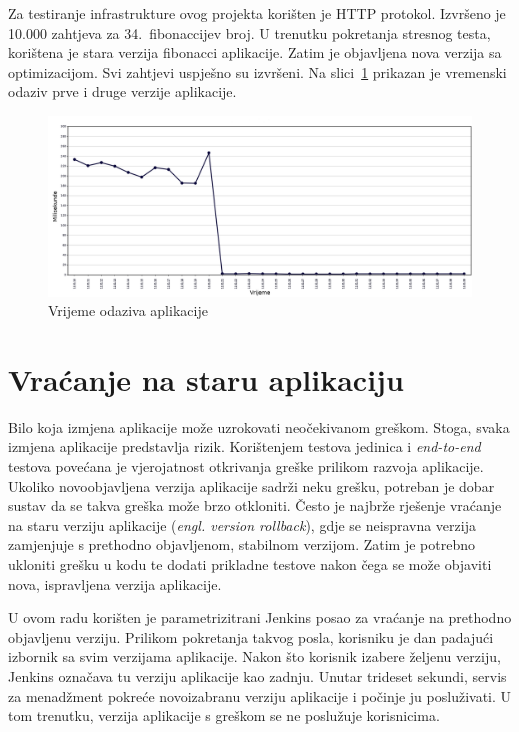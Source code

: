 Za testiranje infrastrukture ovog projekta korišten je HTTP protokol. Izvršeno je 10.000 zahtjeva
za 34.~fibonaccijev broj. U trenutku pokretanja stresnog testa, korištena je stara verzija fibonacci
aplikacije. Zatim je objavljena nova verzija sa optimizacijom. Svi zahtjevi uspješno su izvršeni. Na
slici~\ref{fig:04stresstest} prikazan je vremenski odaziv prve i druge verzije aplikacije.

\begin{figure}[h]
    \centering
    \includegraphics[width=\textwidth]{img/04/response_time.png}
    \caption{Vrijeme odaziva aplikacije}%
    \label{fig:04stresstest}
\end{figure}

\section{Vraćanje na staru aplikaciju}
Bilo koja izmjena aplikacije može uzrokovati neočekivanom greškom. Stoga, svaka izmjena aplikacije
predstavlja rizik. Korištenjem testova jedinica i \textit{end-to-end} testova povećana je
vjerojatnost otkrivanja greške prilikom razvoja aplikacije. Ukoliko novoobjavljena verzija
aplikacije sadrži neku grešku, potreban je dobar sustav da se takva greška može brzo otkloniti.
Često je najbrže rješenje vraćanje na staru verziju aplikacije (\textit{engl. version rollback}),
gdje se neispravna verzija zamjenjuje s prethodno objavljenom, stabilnom verzijom. Zatim je potrebno
ukloniti grešku u kodu te dodati prikladne testove nakon čega se može objaviti nova, ispravljena
verzija aplikacije.

U ovom radu korišten je parametrizitrani Jenkins posao za vraćanje na prethodno objavljenu verziju.
Prilikom pokretanja takvog posla, korisniku je dan padajući izbornik sa svim verzijama aplikacije.
Nakon što korisnik izabere željenu verziju, Jenkins označava tu verziju aplikacije kao zadnju.
Unutar trideset sekundi, servis za menadžment pokreće novoizabranu verziju aplikacije i počinje ju
posluživati. U tom trenutku, verzija aplikacije s greškom se ne poslužuje korisnicima.


